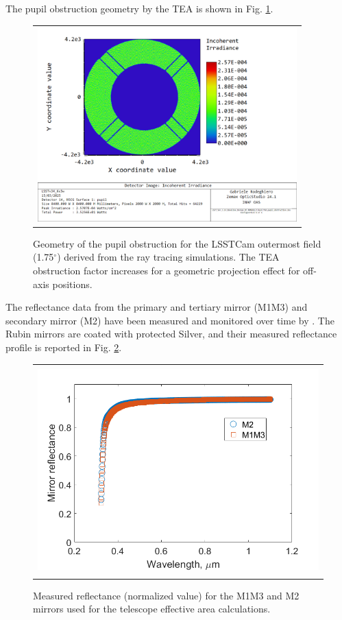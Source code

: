 \documentclass[SE,authoryear,toc]{lsstdoc}
\begin{document}
The pupil obstruction geometry by the TEA is shown in Fig.  \ref{off_obs}.

\begin{figure}
\begin{center}
\begin{tabular}{c}
\includegraphics[height=7.5cm]{Off-axis-obscuration}
\end{tabular}
\end{center}
\caption 
{ \label{off_obs} Geometry of the pupil obstruction for the LSSTCam outermost field (1.75$^\circ$) derived from the ray tracing simulations. The TEA obstruction factor increases for a geometric projection effect for off-axis positions.}
\end{figure} 



The reflectance data from the primary and tertiary mirror (M1M3) and secondary mirror (M2) have been measured and monitored over time by \cite{M1M2M3_Vucina}. The Rubin mirrors are coated with protected Silver, and their measured reflectance profile is reported in Fig. \ref{m1m2m3}.

\begin{figure}
\begin{center}
\begin{tabular}{c}
\includegraphics[height=8cm]{M1M2M3_reflectance}
\end{tabular}
\end{center}
\caption 
{ \label{m1m2m3} Measured reflectance (normalized value) for the M1M3 and M2 mirrors used for the telescope effective area calculations.}
\end{figure} 
\end{document}
